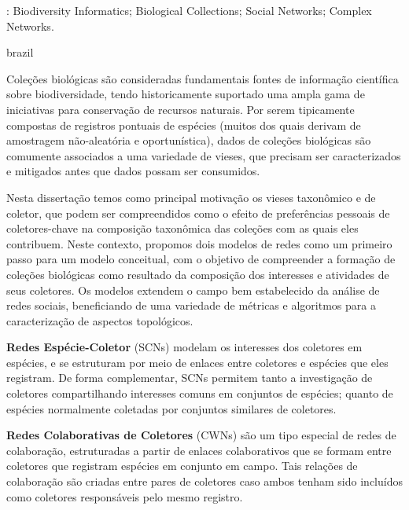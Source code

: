 \documentclass[
	12pt,				%
	openright,			%
	oneside,			%
	a4paper,			%
	sumario=tradicional,%
	french,				%
	spanish,			%
	brazil,				%
    english
	]{abntex2}
\begin{document}
\begin{resumo}
\begin{small}
\textbf{\palavrasChave}: Biodiversity Informatics; Biological Collections; Social Networks; Complex Networks.
\end{small}
\end{resumo}

%

\begin{resumo}[Resumo]
 \begin{otherlanguage*}{brazil}
 \begin{small}
Coleções biológicas são consideradas fundamentais fontes de informação científica sobre biodiversidade, tendo historicamente suportado uma ampla gama de iniciativas para conservação de recursos naturais.
Por serem tipicamente compostas de registros pontuais de espécies (muitos dos quais derivam de amostragem não-aleatória e oportunística), dados de coleções biológicas são comumente associados a uma variedade de vieses, que precisam ser caracterizados e mitigados antes que dados possam ser consumidos.

Nesta dissertação temos como principal motivação os vieses taxonômico e de coletor, que podem ser compreendidos como o efeito de preferências pessoais de coletores-chave na composição taxonômica das coleções com as quais eles contribuem.
Neste contexto, propomos dois modelos de redes como um primeiro passo para um modelo conceitual, com o objetivo de compreender a formação de coleções biológicas como resultado da composição dos interesses e atividades de seus coletores.
Os modelos extendem o campo bem estabelecido da análise de redes sociais, beneficiando de uma variedade de métricas e algoritmos para a caracterização de aspectos topológicos.

\textbf{Redes Espécie-Coletor} (SCNs) modelam os interesses dos coletores em espécies, e se estruturam por meio de enlaces entre coletores e espécies que eles registram.
De forma complementar, SCNs permitem tanto a investigação de coletores compartilhando interesses comuns em conjuntos de espécies; quanto de espécies normalmente coletadas por conjuntos similares de coletores.

\textbf{Redes Colaborativas de Coletores} (CWNs) são um tipo especial de redes de colaboração, estruturadas a partir de enlaces colaborativos que se formam entre coletores que registram espécies em conjunto em campo.
Tais relações de colaboração são criadas entre pares de coletores caso ambos tenham sido incluídos como coletores responsáveis pelo mesmo registro.


\end{small}
\end{otherlanguage*}
\end{resumo}
\end{document}
